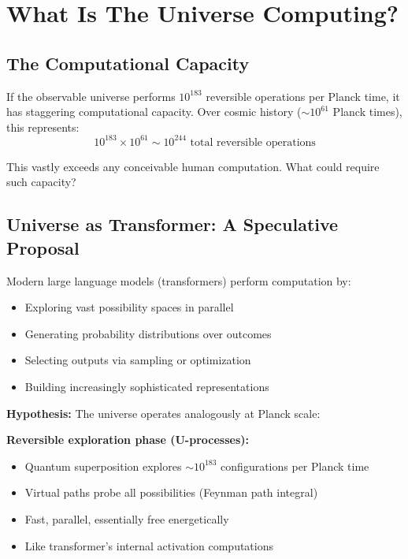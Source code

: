 ﻿\documentclass{article}
\begin{document}
\section{What Is The Universe Computing?}


\subsection{The Computational Capacity}


If the observable universe performs $10^{183}$ reversible operations per Planck time, it has staggering computational capacity. Over cosmic history ($\sim 10^{61}$ Planck times), this represents:
\begin{equation}
10^{183} \times 10^{61} \sim 10^{244} \text{ total reversible operations}
\end{equation}


This vastly exceeds any conceivable human computation. What could require such capacity?


\subsection{Universe as Transformer: A Speculative Proposal}


Modern large language models (transformers) perform computation by:
\begin{itemize}
\item Exploring vast possibility spaces in parallel
\item Generating probability distributions over outcomes
\item Selecting outputs via sampling or optimization
\item Building increasingly sophisticated representations
\end{itemize}


\textbf{Hypothesis:} The universe operates analogously at Planck scale:


\textbf{Reversible exploration phase (U-processes):}
\begin{itemize}
\item Quantum superposition explores $\sim 10^{183}$ configurations per Planck time
\item Virtual paths probe all possibilities (Feynman path integral)
\item Fast, parallel, essentially free energetically
\item Like transformer's internal activation computations
\end{itemize}
\end{document}
